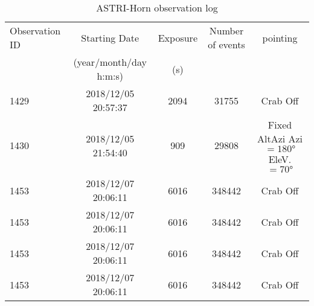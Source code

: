 \begin{table}[ht]
\label{tab:astrilog}
\caption{ASTRI-Horn observation log}
\centering
\begin{tabular}{lcccc}
\hline\hline
Observation ID & Starting Date & Exposure      & Number of events & pointing \\
               & (year/month/day h:m:s) & (s)  \\
\hline     

1429 & 2018/12/05 20:57:37  &   2094     & 31755 & Crab Off    \\
1430 & 2018/12/05 21:54:40  &   909      & 29808 & Fixed AltAzi Azi$=180°$ EleV. $=70°$    \\
1453 & 2018/12/07 20:06:11  &   6016     & 348442 & Crab Off    \\
1453 & 2018/12/07 20:06:11  &   6016     & 348442 & Crab Off    \\
1453 & 2018/12/07 20:06:11  &   6016     & 348442 & Crab Off    \\
1453 & 2018/12/07 20:06:11  &   6016     & 348442 & Crab Off    \\




\end{tabular}
\end{table}
